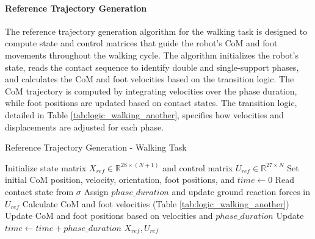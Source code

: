 \documentclass[main.tex]{subfiles}
\begin{document}
\begin{sloppypar}
\paragraph{Reference Trajectory Generation}
The reference trajectory generation algorithm for the walking task is designed to compute state and control matrices that guide the robot's CoM and foot movements throughout the walking cycle. The algorithm initializes the robot's state, reads the contact sequence to identify double and single-support phases, and calculates the CoM and foot velocities based on the transition logic.
The CoM trajectory is computed by integrating velocities over the phase duration, while foot positions are updated based on contact states. The transition logic, detailed in Table \ref{tab:logic_walking_another}, specifies how velocities and displacements are adjusted for each phase.
\begin{algorithm}[H]
\caption{Reference Trajectory Generation - Walking Task}
\label{alg:walking_task}
\begin{algorithmic}[1]
\State Initialize state matrix \( X_{ref} \in \mathbb{R}^{28 \times (N+1)} \) and control matrix \( U_{ref} \in \mathbb{R}^{27 \times N} \)
\State Set initial CoM position, velocity, orientation, foot positions, and $time \gets 0$
    \State Read contact state from \( \sigma \)
    \State Assign \( phase\_duration \) and update ground reaction forces in \( U_{ref} \) 
    \State Calculate CoM and foot velocities (Table \ref{tab:logic_walking_another})
    \State Update CoM and foot positions based on velocities and \( phase\_duration \)
    \State Update \( time \gets time + phase\_duration \)
\EndFor
\State \Return \( X_{ref}, U_{ref} \)
\end{algorithmic}
\end{algorithm}

\begin{table}[H]
\centering
\renewcommand{\arraystretch}{1.2}
\caption{Transition logic for foot and CoM motion updates - Walking Task}
\label{tab:logic_walking_another}
\end{table}


\end{sloppypar}
\end{document}
